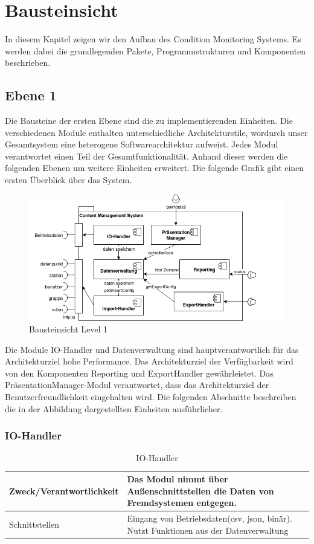 \chapter{Bausteinsicht}
In diesem Kapitel zeigen wir den Aufbau des Condition Monitoring Systems. Es werden dabei die grundlegenden Pakete, Programmstrukturen und Komponenten beschrieben.
\section{Ebene 1}
Die Bausteine der ersten Ebene sind die zu implementierenden Einheiten. Die verschiedenen Module enthalten unterschiedliche Architekturstile, wordurch unser Gesamtsystem eine heterogene Softwarearchitektur aufweist. Jedes Modul verantwortet einen Teil der Gesamtfunktionalität. Anhand dieser werden die folgenden Ebenen um weitere Einheiten erweitert. Die folgende Grafik gibt einen ersten Überblick über das System.
\begin{figure}[h]
	\centering
	\includegraphics[width=1.0\textwidth]{Graphics/bausteinansicht_ebene_1.png}
	\caption{Bausteinsicht Level 1}
	\label{fig:bausteinsichtlvl1}
\end{figure}

Die Module IO-Handler und Datenverwaltung sind hauptverantwortlich für das Architekturziel hohe Performance.
Das Architekturziel der Verfügbarkeit wird von den Komponenten Reporting und ExportHandler gewährleistet. 
Das PräsentationManager-Modul verantwortet, dass das Architekturziel der Benutzerfreundlichkeit eingehalten wird.
Die folgenden Abschnitte beschreiben die in der Abbildung dargestellten Einheiten ausführlicher.
\clearpage
\subsection{IO-Handler}
\begin{table}[th]
	\begin{tabularx}{\textwidth}{p{5cm} X}
		\hline
		 Zweck/Verantwortlichkeit & Das Modul nimmt über Außenschnittstellen die Daten von Fremdsystemen entgegen. \\
		 \hline
		 Schnittstellen &  Eingang von Betriebsdaten(csv, json, binär). Nutzt Funktionen aus der Datenverwaltung \\
		 \hline
	\end{tabularx} 
	\caption{IO-Handler}
	\label{tab:IO-Handler}
\end{table}

